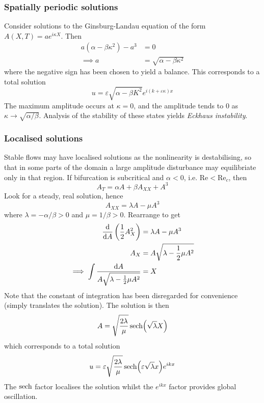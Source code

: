 \documentclass{jknotes}
\newcommand{\ReN}{\text{Re}}
\newcommand{\veps}{\varepsilon}
\begin{document}
\subsubsection{Spatially periodic solutions}
Consider solutions to the Ginsburg-Landau equation of the form $A(X,T) =
ae^{i\kappa X}$. Then
\begin{align}
	a(\alpha - \beta \kappa^2) - a^3 &= 0 \\
	\implies a &= \sqrt{\alpha - \beta \kappa^2}
\end{align}
where the negative sign has been chosen to yield a balance. This corresponds
to a total solution
\begin{equation}
	u = \veps \sqrt{\alpha - \beta K^2} e^{i(k+\veps \kappa)x}
\end{equation}
The maximum amplitude occurs at $\kappa=0$, and the amplitude tends to $0$ as
$\kappa \to \sqrt{\alpha/\beta}$. Analysis of the stability of these states
yields \emph{Eckhaus instability}.

\subsubsection{Localised solutions}
Stable flows may have localised solutions as the nonlinearity is
destabilising, so that in some parts of the domain a large amplitude
disturbance may equilibriate only in that region.  If bifurcation is
subcritical and $\alpha < 0$, i.e. $\ReN < \ReN_c$, then
\begin{equation}
	A_T = \alpha A + \beta A_{XX} + A^3
\end{equation}
Look for a steady, real solution, hence
\begin{equation}
	A_{XX} = \lambda A - \mu A^3
\end{equation}
where $\lambda = -\alpha/\beta > 0$ and $\mu = 1/\beta > 0$. Rearrange to get
\begin{align}
	\frac{\diffd}{\diffd A}\left(\frac{1}{2}A_{X}^2\right) &= \lambda A - \mu
	A^3 \\
	A_X &= A \sqrt{\lambda - \frac{1}{2}\mu A^2} \\
	\implies \int \frac{\diffd A}{A\sqrt{\lambda - \frac{1}{2}\mu A^2}} &= X
\end{align}
Note that the constant of integration has been disregarded for convenience
(simply translates the solution).  The solution is then
\begin{equation}
	A = \sqrt{\frac{2\lambda}{\mu}} \sech(\sqrt{\lambda}X)
\end{equation}
which corresponds to a total solution
\begin{equation}
	u = \veps \sqrt{\frac{2\lambda}{\mu}} \sech (\veps \sqrt{\lambda}x)e^{ikx}
\end{equation}
The $\sech$ factor localises the solution whilst the $e^{ikx}$ factor provides
global oscillation.
\end{document}

